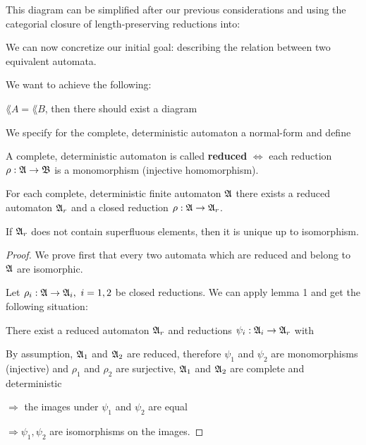 This diagram can be simplified after our previous considerations and using the
categorial closure of length-preserving reductions into:

\begin{center}
\end{center}

We can now concretize our initial goal: describing the relation between
two equivalent automata.

We want to achieve the following:

$\lang{A} = \lang{B}$, then there should exist a diagram

\missingfigure

We specify for the complete, deterministic automaton a normal-form and define

\begin{definition}
A complete, deterministic automaton is called {\bf reduced} $\iff$ each
reduction $\rho : \mbox{$\mathfrak{A}$} \to \mbox{$\mathfrak{B}$}$ is a monomorphism (injective homomorphism).
\end{definition}

\begin{lemma}
For each complete, deterministic finite automaton $\mbox{$\mathfrak{A}$}$ there exists a
reduced automaton $\mbox{$\mathfrak{A}$}_r$ and a closed reduction $\rho : \mbox{$\mathfrak{A}$} \to
\mbox{$\mathfrak{A}$}_r$.

If $\mbox{$\mathfrak{A}$}_r$ does not contain superfluous elements, then it is unique up to
isomorphism.
\end{lemma}

\begin{proof}
We prove first that every two automata which are reduced and belong to $\mbox{$\mathfrak{A}$}$
are isomorphic.

Let $\rho_i : \mbox{$\mathfrak{A}$} \to \mbox{$\mathfrak{A}$}_i,\ i = 1, 2$ be closed reductions. We can apply
lemma 1 and get the following situation:

There exist a reduced automaton $\mbox{$\mathfrak{A}$}_r$ and reductions $\psi_i : \mbox{$\mathfrak{A}$}_i
\to \mbox{$\mathfrak{A}$}_r$ with

\begin{center}
\end{center}

By assumption, $\mbox{$\mathfrak{A}$}_1$ and $\mbox{$\mathfrak{A}$}_2$ are reduced, therefore $\psi_1$ and
$\psi_2$ are monomorphisms (injective) and $\rho_1$ and $\rho_2$ are surjective,
$\mbox{$\mathfrak{A}$}_1$ and $\mbox{$\mathfrak{A}$}_2$	are complete and deterministic

$\Rightarrow$ the images under $\psi_1$ and $\psi_2$ are equal

$\Rightarrow \psi_1, \psi_2$ are isomorphisms on the images. 
\end{proof}

